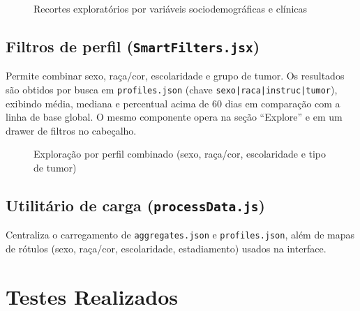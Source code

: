 \begin{figure}[H]
\centering
\caption{Recortes exploratórios por variáveis sociodemográficas e clínicas}
\label{fig:recortes}
\end{figure}

\subsection{Filtros de perfil (\texttt{SmartFilters.jsx})}

Permite combinar sexo, raça/cor, escolaridade e grupo de tumor. Os resultados são obtidos por busca em \texttt{profiles.json} (chave \texttt{sexo|raca|instruc|tumor}), exibindo média, mediana e percentual acima de 60 dias em comparação com a linha de base global. O mesmo componente opera na seção ``Explore'' e em um drawer de filtros no cabeçalho.

\begin{figure}[H]
\centering
\caption{Exploração por perfil combinado (sexo, raça/cor, escolaridade e tipo de tumor)}
\label{fig:explore}
\end{figure}

\subsection{Utilitário de carga (\texttt{processData.js})}

Centraliza o carregamento de \texttt{aggregates.json} e \texttt{profiles.json}, além de mapas de rótulos (sexo, raça/cor, escolaridade, estadiamento) usados na interface.

\section{Testes Realizados}

